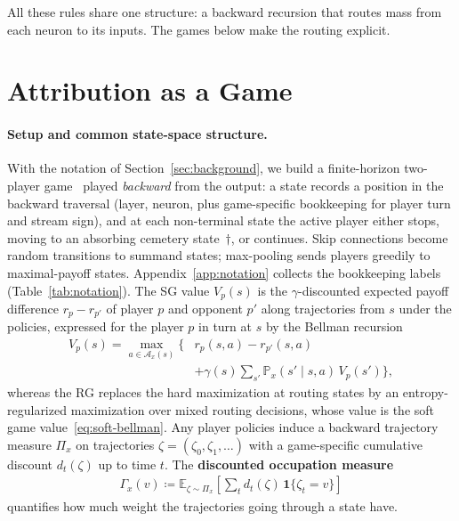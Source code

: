 \documentclass[twoside]{article}
\renewcommand{\P}{\mathbb{P}}
\providecommand{\E}{}
\renewcommand{\E}{\mathbb{E}}
\newcommand{\1}{\mathbf{1}}
\begin{document}
All these rules share one structure: a backward recursion that routes mass from each neuron to its
inputs. The games below make the routing explicit.
\section{Attribution as a Game}\label{sec:game}

\paragraph{Setup and common state-space structure.}
With the notation of Section~\ref{sec:background}, we build a finite-horizon two-player
game~\citep{OsborneRubinstein1994} played \emph{backward} from the output: a state records a
position in the backward traversal (layer, neuron, plus game-specific bookkeeping for player turn
and stream sign), and at each non-terminal state the active player either stops, moving to an
absorbing cemetery state~$\dagger$, or continues. Skip connections become random transitions to
summand states; max-pooling sends players greedily to maximal-payoff states.
Appendix~\ref{app:notation} collects the bookkeeping labels (Table~\ref{tab:notation}).
The \ac{SG} value $V_p(s)$ is the $\gamma$-discounted expected payoff difference $r_p - r_{p'}$ of
player $p$ and opponent $p'$ along trajectories from $s$ under the policies, expressed for the
player $p$ in turn at $s$ by the Bellman recursion
\begin{align}\label{eq:bellman}
    V_p(s) = \max_{a \in \mathcal{A}_x(s)} \Big\{ &r_p(s,a) - r_{p'}(s,a) \nonumber\\
    &+ \gamma(s) \textstyle\sum_{s'} \P_x(s' \mid s,a)\, V_p(s') \Big\},
\end{align}
whereas the \acl{RG} replaces the hard maximization at routing states by an entropy-regularized
maximization over mixed routing decisions, whose value is the soft game
value~\eqref{eq:soft-bellman}.
Any player policies induce a backward trajectory measure $\Pi_x$ on trajectories $\zeta=(\zeta_0,
    \zeta_1, \dots)$ with a game-specific cumulative discount $d_t(\zeta)$ up to time $t$.
The \textbf{discounted occupation measure}~\citep{Puterman1994}
\begin{align}\label{eq:attribution}
    \Gamma_x(v) \coloneqq \E_{\zeta \sim \Pi_x}\!\left[ \textstyle\sum_t d_t(\zeta)\,\1\{\zeta_t = v\}
    \right]
\end{align}
quantifies how much weight the trajectories going through a state have.
\end{document}
